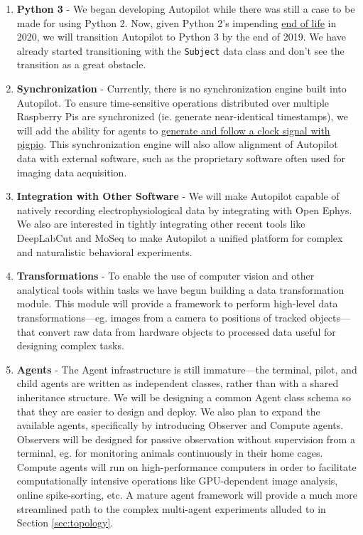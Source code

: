 \begin{enumerate}[ref=\thechapter.\arabic*]
    \item \textbf{Python 3} - We began developing Autopilot while there was still a case to be made for using Python 2. Now, given Python 2's impending \href{https://www.python.org/dev/peps/pep-0373/#update}{end of life} in 2020, we will transition Autopilot to Python 3 by the end of 2019. We have already started transitioning with the \texttt{Subject} data class and don't see the transition as a great obstacle.
    \item \textbf{Synchronization} - Currently, there is no synchronization engine built into Autopilot. To ensure time-sensitive operations distributed over multiple Raspberry Pis are synchronized (ie. generate near-identical timestamps), we will add the ability for agents to \href{http://abyz.me.uk/rpi/pigpio/python.html#hardware_clock}{generate and follow a clock signal with pigpio}. This synchronization engine will also allow alignment of Autopilot data with external software, such as the proprietary software often used for imaging data acquisition.
    \item \label{item:othertools} \textbf{Integration with Other Software} - We will make Autopilot capable of natively recording electrophysiological data by integrating with Open Ephys\citep{siegleOpenEphysOpensource2017}. We also are interested in tightly integrating other recent tools like DeepLabCut\citep{nathUsingDeepLabCut3D2019} and MoSeq\citep{wiltschkoMappingSubSecondStructure2015} to make Autopilot a unified platform for complex and naturalistic behavioral experiments.
    \item \textbf{Transformations} - To enable the use of computer vision and other analytical tools within tasks we have begun building a data transformation module. This module will provide a framework to perform high-level data transformations---eg. images from a camera to positions of tracked objects---that convert raw data from hardware objects to processed data useful for designing complex tasks.
    \item \textbf{Agents}\label{sec:futureagents} - The Agent infrastructure is still immature---the terminal, pilot, and child agents are written as independent classes, rather than with a shared inheritance structure. We will be designing a common Agent class schema so that they are easier to design and deploy. We also plan to expand the available agents, specifically by introducing Observer and Compute agents. Observers will be designed for passive observation without supervision from a terminal, eg. for monitoring animals continuously in their home cages. Compute agents will run on high-performance computers in order to facilitate computationally intensive operations like GPU-dependent image analysis, online spike-sorting, etc. A mature agent framework will provide a much more streamlined path to the complex multi-agent experiments alluded to in Section \ref{sec:topology}.

\end{enumerate}
